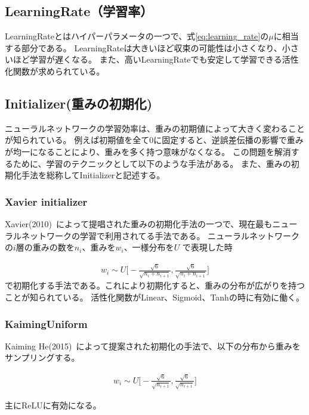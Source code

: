 \subsection{LearningRate（学習率）}

LearningRateとはハイパーパラメータの一つで、式\ref{eq:learning_rate}の$ \mu $に相当する部分である。
LearningRateは大きいほど収束の可能性は小さくなり、小さいほど学習が遅くなる。
また、高いLearningRateでも安定して学習できる活性化関数が求められている。


\subsection{Initializer(重みの初期化)}
ニューラルネットワークの学習効率は、重みの初期値によって大きく変わることが知られている。
例えば初期値を全て$ 0 $に固定すると、逆誤差伝播の影響で重みが均一になることにより、重みを多く持つ意味がなくなる。
この問題を解消するために、学習のテクニックとして以下のような手法がある。
また、重みの初期化手法を総称してInitializerと記述する。

\subsubsection{Xavier initializer}
Xavier(2010)~\cite{xavier}によって提唱された重みの初期化手法の一つで、現在最もニューラルネットワークの学習で利用されてる手法である。
ニューラルネットワークの$ i $層の重みの数を$ n_{i} $、重みを$ w_i $、一様分布を$U$ で表現した時

\begin{eqnarray}
w_{i} \sim U \bigl[ - \frac{\sqrt{6}}{ \sqrt{n_i + n_{i+1}} }, \frac{\sqrt{6}}{ \sqrt{n_i + n_{i+1} }} \bigr]
\end{eqnarray}
で初期化する手法である。これにより初期化すると、重みの分布が広がりを持つことが知られている。
活性化関数がLinear、Sigmoid、Tanhの時に有効に働く。

\subsubsection{KaimingUniform}
Kaiming He(2015)~\cite{kaiming}によって提案された初期化の手法で、以下の分布から重みをサンプリングする。

\begin{eqnarray}
w_{i} \sim U \bigl[ - \frac{\sqrt{6}}{ \sqrt{n_{i+1}} }, \frac{\sqrt{6}}{ \sqrt{ n_{i+1} }} \bigr]
\end{eqnarray}

主にReLUに有効になる。


